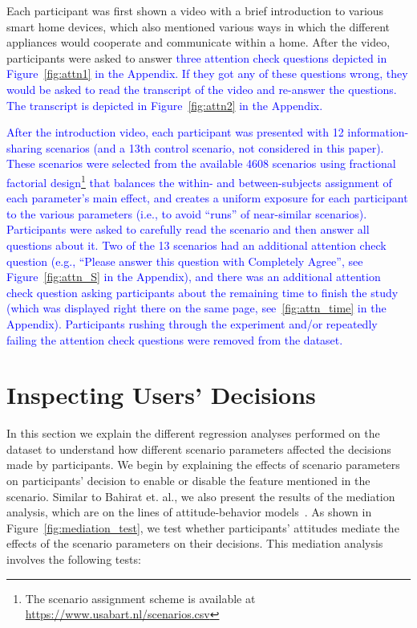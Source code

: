 Each participant was first shown a video with a brief introduction to various smart home devices, which also mentioned various ways in which the different appliances would cooperate and communicate within a home. After the video, participants were asked to answer \textcolor{blue}{three attention check questions depicted in Figure~\ref{fig:attn1} in the Appendix.
	If they got any of these questions wrong, they would be asked to read the transcript of the video and re-answer the questions. The transcript is depicted in Figure~\ref{fig:attn2} in the Appendix.}

\textcolor{blue}{After the introduction video, each participant was presented with 12 information-sharing scenarios (and a 13th control scenario, not considered in this paper). These scenarios were selected from the available 4608 scenarios using fractional factorial design\footnote{The scenario assignment scheme is available at \url{https://www.usabart.nl/scenarios.csv}} that balances the within- and between-subjects assignment of each parameter's main effect, and creates a uniform exposure for each participant to the various parameters (i.e., to avoid ``runs'' of near-similar scenarios). Participants were asked to carefully read the scenario and then answer all questions about it. Two of the 13 scenarios had an additional attention check question (e.g., ``Please answer this question with Completely Agree'', see Figure~\ref{fig:attn_S} in the Appendix), and there was an additional attention check question asking participants about the remaining time to finish the study (which was displayed right there on the same page, see~\ref{fig:attn_time} in the Appendix). Participants rushing through the experiment and/or repeatedly failing the attention check questions were removed from the dataset.}

\section{Inspecting Users' Decisions}\label{sec:inspect}
In this section we explain the different regression analyses performed on the dataset to understand how different scenario parameters affected the decisions made by participants. We begin by explaining the effects of scenario parameters on participants' decision to enable or disable the feature mentioned in the scenario. Similar to Bahirat et. al., we also present the results of the mediation analysis, which are on the lines of attitude-behavior models~\cite{bahiratiui2018,ajzen1977attitude}. As shown in Figure~\ref{fig:mediation_test}, we test whether participants' attitudes mediate the effects of the scenario parameters on their decisions. This mediation analysis involves the following tests:


